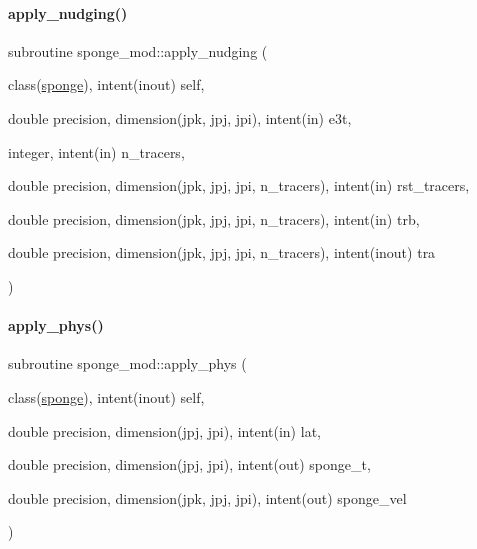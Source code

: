 \paragraph{\texorpdfstring{apply\+\_\+nudging()}{apply\_nudging()}}
{\footnotesize\ttfamily subroutine sponge\+\_\+mod\+::apply\+\_\+nudging (\begin{DoxyParamCaption}\item[{class(\mbox{\hyperlink{structsponge__mod_1_1sponge}{sponge}}), intent(inout)}]{self,  }\item[{double precision, dimension(jpk, jpj, jpi), intent(in)}]{e3t,  }\item[{integer, intent(in)}]{n\+\_\+tracers,  }\item[{double precision, dimension(jpk, jpj, jpi, n\+\_\+tracers), intent(in)}]{rst\+\_\+tracers,  }\item[{double precision, dimension(jpk, jpj, jpi, n\+\_\+tracers), intent(in)}]{trb,  }\item[{double precision, dimension(jpk, jpj, jpi, n\+\_\+tracers), intent(inout)}]{tra }\end{DoxyParamCaption})}

\mbox{\label{namespacesponge__mod_a8204c3a6cd2ef9af239892d07afbc624}} 
\paragraph{\texorpdfstring{apply\+\_\+phys()}{apply\_phys()}}
{\footnotesize\ttfamily subroutine sponge\+\_\+mod\+::apply\+\_\+phys (\begin{DoxyParamCaption}\item[{class(\mbox{\hyperlink{structsponge__mod_1_1sponge}{sponge}}), intent(inout)}]{self,  }\item[{double precision, dimension(jpj, jpi), intent(in)}]{lat,  }\item[{double precision, dimension(jpj, jpi), intent(out)}]{sponge\+\_\+t,  }\item[{double precision, dimension(jpk, jpj, jpi), intent(out)}]{sponge\+\_\+vel }\end{DoxyParamCaption})}

\mbox{\label{namespacesponge__mod_a2297300de5b2b8efa48a75a41a4fddc0}} 
